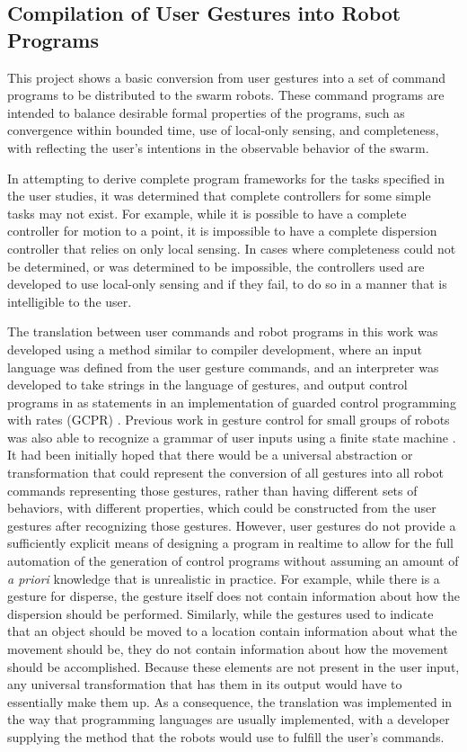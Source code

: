 \subsection{Compilation of User Gestures into Robot Programs} \label{section:Compilation_of_User_Gestures_into_Robot_Programs}

This project shows a basic conversion from user gestures into a set of command programs to be distributed to the swarm robots.
These command programs are intended to balance desirable formal properties of the programs, such as convergence within bounded time, use of local-only sensing, and completeness, with reflecting the user's intentions in the observable behavior of the swarm. 

In attempting to derive complete program frameworks for the tasks specified in the user studies, it was determined that complete controllers for some simple tasks may not exist. 
For example, while it is possible to have a complete controller for motion to a point, it is impossible to have a complete dispersion controller that relies on only local sensing. 
In cases where completeness could not be determined, or was determined to be impossible, the controllers used are developed to use local-only sensing and if they fail, to do so in a manner that is intelligible to the user. 

The translation between user commands and robot programs in this work was developed using a method similar to compiler development, where an input language was defined from the user gesture commands, and an interpreter was developed to take strings in the language of gestures, and output control programs in as statements in an implementation of guarded control programming with rates (GCPR) \citep{napp2011compositional}.  
Previous work in gesture control for small groups of robots was also able to recognize a grammar of user inputs using a finite state machine \citep{micire2010multi}.
It had been initially hoped that there would be a universal abstraction or transformation that could represent the conversion of all gestures into all robot commands representing those gestures, rather than having different sets of behaviors, with different properties, which could be constructed from the user gestures after recognizing those gestures. 
However, user gestures do not provide a sufficiently explicit means of designing a program in realtime to allow for the full automation of the generation of control programs without assuming an amount of \emph{a priori} knowledge that is unrealistic in practice. 
For example, while there is a gesture for disperse, the gesture itself does not contain information about how the dispersion should be performed. 
Similarly, while the gestures used to indicate that an object should be moved to a location contain information about what the movement should be, they do not contain information about how the movement should be accomplished. 
Because these elements are not present in the user input, any universal transformation that has them in its output would have to essentially make them up. 
As a consequence, the translation was implemented in the way that programming languages are usually implemented, with a developer supplying the method that the robots would use to fulfill the user's commands. 


